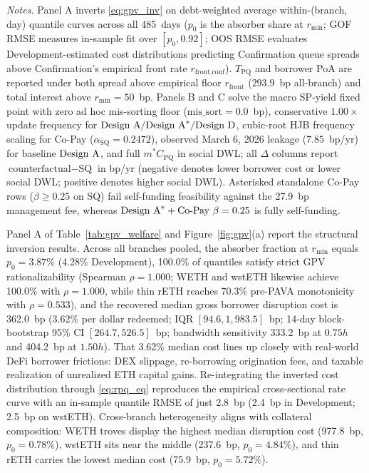 \begin{table}[!htbp]
\par\vspace{4pt}\begin{minipage}{\textwidth}\footnotesize\setlength{\parskip}{0pt}\textit{Notes.} Panel A inverts \eqref{eq:gpv_inv} on debt-weighted average within-(branch, day) quantile curves across all 485~days ($p_0$ is the absorber share at $r_{\min}$; GOF RMSE measures in-sample fit over $[p_0, 0.92]$; OOS RMSE evaluates Development-estimated cost distributions predicting Confirmation queue spreads above Confirmation's empirical front rate $r_{\text{front,conf}}$). $T_{\text{PQ}}$ and borrower PoA are reported under both spread above empirical floor $r_{\text{front}}$ ($293.9$~bp all-branch) and total interest above $r_{\min} = 50$~bp. Panels B and C solve the macro SP-yield fixed point with zero ad hoc mis-sorting floor ($\text{mis\_sort} = 0.0$~bp), conservative $1.00\times$ update frequency for $\text{Design A}/\text{Design A}^*/\text{Design D}$, cubic-root HJB frequency scaling for Co-Pay ($\alpha_{\text{SQ}} = 0.2472$), observed March 6, 2026 leakage ($7.85$~bp/yr) for baseline $\text{Design A}$, and full $m^* C_{\text{PQ}}$ in social DWL; all $\Delta$ columns report $\text{counterfactual} - \text{SQ}$ in bp/yr (negative denotes lower borrower cost or lower social DWL; positive denotes higher social DWL). Asterisked standalone Co-Pay rows ($\beta \ge 0.25$ on SQ) fail self-funding feasibility against the 27.9~bp management fee, whereas $\text{Design A}^* + \text{Co-Pay }\beta=0.25$ is fully self-funding.
\end{minipage}
\end{table}

Panel A of Table~\ref{tab:gpv_welfare} and Figure~\ref{fig:gpv}(a) report the structural inversion results. Across all branches pooled, the absorber fraction at $r_{\min}$ equals $p_0 = 3.87\%$ (4.28\% Development), 100.0\% of quantiles satisfy strict GPV rationalizability (Spearman $\rho = 1.000$; WETH and wstETH likewise achieve 100.0\% with $\rho = 1.000$, while thin rETH reaches 70.3\% pre-PAVA monotonicity with $\rho = 0.533$), and the recovered median gross borrower disruption cost is 362.0~bp (3.62\% per dollar redeemed; IQR $[94.6, 1{,}983.5]$~bp; 14-day block-bootstrap 95\% CI $[264.7, 526.5]$~bp; bandwidth sensitivity 333.2~bp at $0.75h$ and 404.2~bp at $1.50h$). That 3.62\% median cost lines up closely with real-world DeFi borrower frictions: DEX slippage, re-borrowing origination fees, and taxable realization of unrealized ETH capital gains. Re-integrating the inverted cost distribution through \eqref{eq:rpq_eq} reproduces the empirical cross-sectional rate curve with an in-sample quantile RMSE of just 2.8~bp (2.4~bp in Development; 2.5~bp on wstETH). Cross-branch heterogeneity aligns with collateral composition: WETH troves display the highest median disruption cost (977.8~bp, $p_0 = 0.78\%$), wstETH sits near the middle (237.6~bp, $p_0 = 4.84\%$), and thin rETH carries the lowest median cost (75.9~bp, $p_0 = 5.72\%$).

